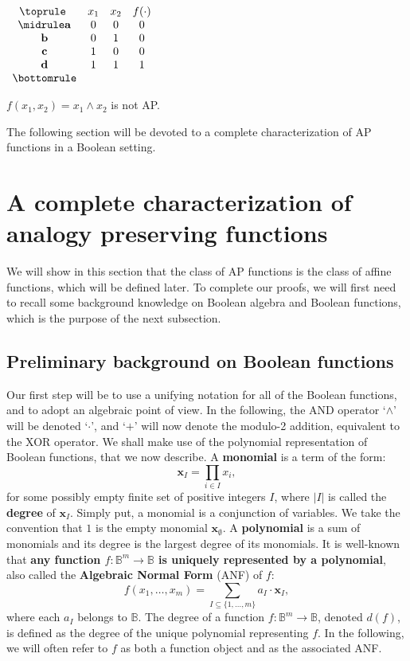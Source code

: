 \begin{table}[ht]
  \center
$\begin{array}{cccc}
  \toprule
  ~ & x_1 & x_2 & f(\cdot) \\
  \midrule
  \mathbf{a} & 0 & 0 & 0\\
  \mathbf{b} & 0 & 1 & 0\\
  \mathbf{c} & 1 & 0 & 0\\
  \mathbf{d} & 1 & 1 & 1\\
  \bottomrule
\end{array}
$\bigskip
\caption{$f(x_1,x_2)= x_1 \wedge x_2$ is not AP.}
\label{exampleNotAP}
\end{table}

The following section will be devoted to a complete characterization of AP
functions in a Boolean setting.

\section{A complete characterization of analogy preserving functions}
\label{SEC:a_complete_characterization_of_AP_functions}

We will show in this section that the class of AP functions is the class of
affine functions, which will be defined later. To complete our proofs, we will
first need to recall some background knowledge on Boolean algebra and Boolean
functions, which is the purpose of the next subsection.

\subsection{Preliminary background on Boolean functions}

Our first step will be to use a unifying notation for all of the Boolean
functions, and to adopt an algebraic point of view.  In the following, the AND
operator `$\wedge$' will be denoted `$\cdot$', and `$+$' will now denote the
modulo-2 addition, equivalent to the XOR operator.  We shall make use of the
polynomial representation of Boolean functions, that we now describe. A
\textbf{ monomial} is a term of the form:
$$\mathbf{x}_I=\underset{i\in I}{\prod}x_i,$$ for some possibly empty finite
set of positive integers $I$, where $|I|$ is called the \textbf{degree} of
$\mathbf{x}_I$. Simply put, a monomial is a conjunction of variables. We take
the convention that $1$ is the empty monomial $\mathbf{x}_\emptyset $. A
\textbf{ polynomial} is a sum of monomials and its degree is the largest degree
of its monomials.  It is well-known \cite{StoneAlgebra36,ZhegalkinAlgebra27}
that \textbf{any function $f:\mathbb{B}^m\rightarrow \mathbb{B}$ is uniquely
represented by a polynomial}, also called the \textbf{Algebraic Normal Form}
(ANF) of $f$:
$$f(x_1,\ldots,x_m)=\sum_{I\subseteq \{1,\ldots,m\}}a_I\cdot \mathbf{x}_I,$$
where each $a_I$ belongs to $\mathbb{B}$. The degree of a function $f:\mathbb{B}^m\rightarrow
\mathbb{B}$, denoted $d(f)$, is defined as the degree of the unique polynomial
representing $f$. In the following, we will often refer to $f$ as both a
function object and as the associated ANF.

